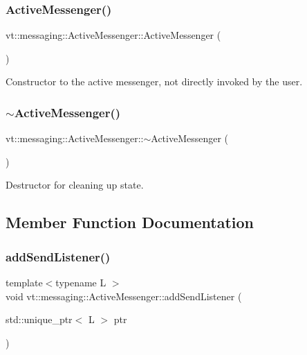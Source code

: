 \subsubsection{\texorpdfstring{Active\+Messenger()}{ActiveMessenger()}}
{\footnotesize\ttfamily vt\+::messaging\+::\+Active\+Messenger\+::\+Active\+Messenger (\begin{DoxyParamCaption}{ }\end{DoxyParamCaption})}



Constructor to the active messenger, not directly invoked by the user. 

\mbox{\label{structvt_1_1messaging_1_1_active_messenger_a10ef2a3dae9bcaddaa1f80903274e7b3}} 
\subsubsection{\texorpdfstring{$\sim$\+Active\+Messenger()}{~ActiveMessenger()}}
{\footnotesize\ttfamily vt\+::messaging\+::\+Active\+Messenger\+::$\sim$\+Active\+Messenger (\begin{DoxyParamCaption}{ }\end{DoxyParamCaption})\hspace{0.3cm}{\ttfamily [virtual]}}



Destructor for cleaning up state. 



\subsection{Member Function Documentation}
\mbox{\label{structvt_1_1messaging_1_1_active_messenger_a3083324696bb4f6e55164da2cb00a1c6}} 
\subsubsection{\texorpdfstring{add\+Send\+Listener()}{addSendListener()}}
{\footnotesize\ttfamily template$<$typename L $>$ \\
void vt\+::messaging\+::\+Active\+Messenger\+::add\+Send\+Listener (\begin{DoxyParamCaption}\item[{std\+::unique\+\_\+ptr$<$ L $>$}]{ptr }\end{DoxyParamCaption})\hspace{0.3cm}{\ttfamily [inline]}}



